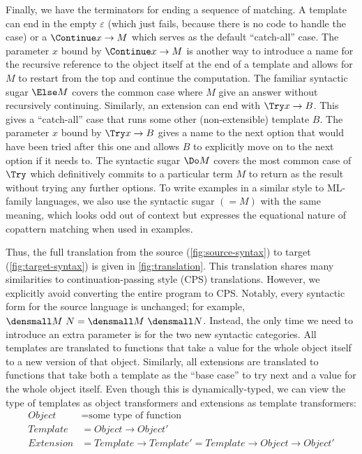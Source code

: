 Finally, we have the terminators for ending a sequence of matching.
A template can end in the empty $\varepsilon$ (which just fails, because there is no code to handle the case) or a $\Continue x \to M$ which serves as the default ``catch-all'' case.
The parameter $x$ bound by $\Continue x \to M$ is another way to introduce a name for the recursive reference to the object itself at the end of a template  and allows for $M$ to restart from the top and continue the computation.
The familiar syntactic sugar $\Else M$ covers the common case where $M$ give an answer without recursively continuing.
Similarly, an extension can end with $\Try x \to B$. This gives a ``catch-all'' case that runs some other (non-extensible) template $B$.
The parameter $x$ bound by $\Try x \to B$ gives a name to the next option that would have been tried after this one and allows $B$ to explicitly move on to the next option if it needs to.
The syntactic sugar $\Do M$ covers the most common case of $\Try$ which definitively commits to a particular term $M$ to return as the result without trying any further options.
To write examples in a similar style to ML-family languages, we also use the syntactic sugar $(= M)$ with the same meaning, which looks odd out of context but expresses the equational nature of copattern matching when used in examples.

Thus, the full translation from the source (\cref{fig:source-syntax}) to target (\cref{fig:target-syntax}) is given in \cref{fig:translation}.
This translation shares many similarities to continuation-passing style (CPS) translations.
However, we explicitly avoid converting the entire program to CPS.
Notably, every syntactic form for the source language is unchanged; for example, $\den{M~N} = \den{M} ~ \den{N}$.
Instead, the only time we need to introduce an extra parameter is for the two new syntactic categories.
All templates are translated to functions that take a value for the whole object itself to a new version of that object.
Similarly, all extensions are translated to functions that take both a template as the ``base case'' to try next and a value for the whole object itself.
Even though this is dynamically-typed, we can view the type of templates as object transformers and extensions as template transformers:
\begin{align*}
  Object &= \text{some type of function}
  \\
  Template &= Object \to Object'
  \\
  Extension &= Template \to Template'
  = Template \to Object \to Object'
\end{align*}

